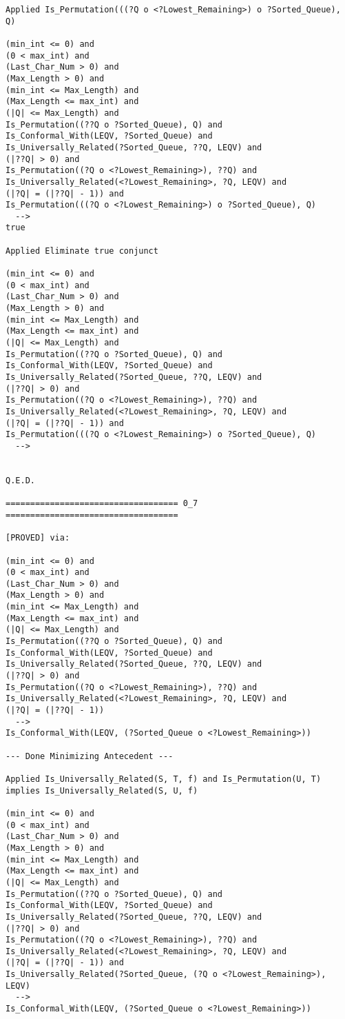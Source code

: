 \begin{lstlisting}[language=resolve]
Applied Is_Permutation(((?Q o <?Lowest_Remaining>) o ?Sorted_Queue), Q)

(min_int <= 0) and
(0 < max_int) and
(Last_Char_Num > 0) and
(Max_Length > 0) and
(min_int <= Max_Length) and
(Max_Length <= max_int) and
(|Q| <= Max_Length) and
Is_Permutation((??Q o ?Sorted_Queue), Q) and
Is_Conformal_With(LEQV, ?Sorted_Queue) and
Is_Universally_Related(?Sorted_Queue, ??Q, LEQV) and
(|??Q| > 0) and
Is_Permutation((?Q o <?Lowest_Remaining>), ??Q) and
Is_Universally_Related(<?Lowest_Remaining>, ?Q, LEQV) and
(|?Q| = (|??Q| - 1)) and
Is_Permutation(((?Q o <?Lowest_Remaining>) o ?Sorted_Queue), Q)
  -->
true

Applied Eliminate true conjunct

(min_int <= 0) and
(0 < max_int) and
(Last_Char_Num > 0) and
(Max_Length > 0) and
(min_int <= Max_Length) and
(Max_Length <= max_int) and
(|Q| <= Max_Length) and
Is_Permutation((??Q o ?Sorted_Queue), Q) and
Is_Conformal_With(LEQV, ?Sorted_Queue) and
Is_Universally_Related(?Sorted_Queue, ??Q, LEQV) and
(|??Q| > 0) and
Is_Permutation((?Q o <?Lowest_Remaining>), ??Q) and
Is_Universally_Related(<?Lowest_Remaining>, ?Q, LEQV) and
(|?Q| = (|??Q| - 1)) and
Is_Permutation(((?Q o <?Lowest_Remaining>) o ?Sorted_Queue), Q)
  -->


Q.E.D.

=================================== 0_7 ===================================

[PROVED] via:

(min_int <= 0) and
(0 < max_int) and
(Last_Char_Num > 0) and
(Max_Length > 0) and
(min_int <= Max_Length) and
(Max_Length <= max_int) and
(|Q| <= Max_Length) and
Is_Permutation((??Q o ?Sorted_Queue), Q) and
Is_Conformal_With(LEQV, ?Sorted_Queue) and
Is_Universally_Related(?Sorted_Queue, ??Q, LEQV) and
(|??Q| > 0) and
Is_Permutation((?Q o <?Lowest_Remaining>), ??Q) and
Is_Universally_Related(<?Lowest_Remaining>, ?Q, LEQV) and
(|?Q| = (|??Q| - 1))
  -->
Is_Conformal_With(LEQV, (?Sorted_Queue o <?Lowest_Remaining>))

--- Done Minimizing Antecedent ---

Applied Is_Universally_Related(S, T, f) and Is_Permutation(U, T) implies Is_Universally_Related(S, U, f)

(min_int <= 0) and
(0 < max_int) and
(Last_Char_Num > 0) and
(Max_Length > 0) and
(min_int <= Max_Length) and
(Max_Length <= max_int) and
(|Q| <= Max_Length) and
Is_Permutation((??Q o ?Sorted_Queue), Q) and
Is_Conformal_With(LEQV, ?Sorted_Queue) and
Is_Universally_Related(?Sorted_Queue, ??Q, LEQV) and
(|??Q| > 0) and
Is_Permutation((?Q o <?Lowest_Remaining>), ??Q) and
Is_Universally_Related(<?Lowest_Remaining>, ?Q, LEQV) and
(|?Q| = (|??Q| - 1)) and
Is_Universally_Related(?Sorted_Queue, (?Q o <?Lowest_Remaining>), LEQV)
  -->
Is_Conformal_With(LEQV, (?Sorted_Queue o <?Lowest_Remaining>))


\end{lstlisting}
